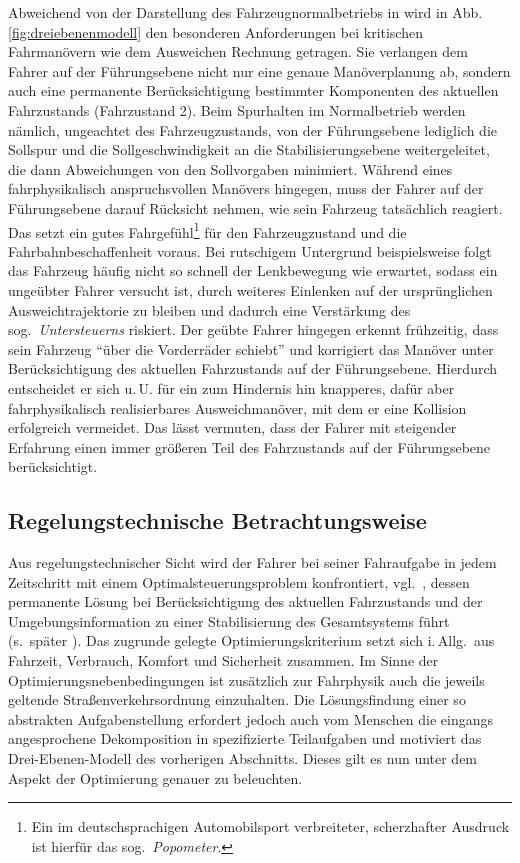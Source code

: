 Abweichend von der Darstellung des Fahrzeugnormalbetriebs in \cite{handbuchFAS_Donges2012} wird in Abb.\,\ref{fig:dreiebenenmodell} den besonderen Anforderungen bei kritischen Fahrmanövern wie dem Ausweichen Rechnung getragen. Sie verlangen dem Fahrer auf der Führungsebene nicht nur eine genaue Manöverplanung ab, sondern auch eine permanente Berücksichtigung bestimmter Komponenten des aktuellen Fahrzustands (Fahrzustand 2). 
Beim Spurhalten im Normalbetrieb werden nämlich, ungeachtet des Fahrzeugzustands, von der Führungsebene lediglich die Sollspur und die Sollgeschwindigkeit an die Stabilisierungsebene weitergeleitet, die dann Abweichungen von den Sollvorgaben minimiert. Während eines fahrphysikalisch anspruchsvollen Manövers hingegen, muss der Fahrer auf der Führungsebene darauf Rücksicht nehmen, wie sein %
Fahrzeug tatsächlich reagiert. Das setzt ein gutes Fahrgefühl\footnote{Ein im deutschsprachigen Automobilsport verbreiteter, scherzhafter Ausdruck ist hierfür das sog.\ \emph{Popometer}.} für den Fahrzeugzustand und die Fahrbahnbeschaffenheit voraus. 
Bei rutschigem Untergrund beispielsweise folgt das Fahrzeug häufig nicht so schnell der Lenkbewegung wie erwartet, sodass ein ungeübter Fahrer versucht ist, durch weiteres Einlenken auf der ursprünglichen Ausweichtrajektorie zu bleiben und dadurch eine Verstärkung des sog.\ \emph{Untersteuerns} riskiert. Der geübte Fahrer hingegen erkennt frühzeitig, dass sein Fahrzeug "`über die Vorderräder schiebt"' und korrigiert das Manöver unter Berücksichtigung des aktuellen Fahrzustands %
auf der Führungsebene.  Hierdurch entscheidet er sich u.\,U. für ein zum Hindernis hin knapperes, dafür aber fahrphysikalisch realisierbares Ausweichmanöver, mit dem er eine Kollision erfolgreich vermeidet.
Das lässt vermuten, dass der Fahrer mit steigender Erfahrung einen immer größeren Teil des Fahrzustands auf der Führungsebene berücksichtigt.

\subsection{Regelungstechnische Betrachtungsweise}
Aus regelungstechnischer Sicht wird der Fahrer bei seiner Fahraufgabe in jedem Zeitschritt mit einem  Optimalsteuerungsproblem \cite{foellingeroptimal} konfrontiert, vgl.\ \cite{prokop2001modeling, preusse2001fahrzeugfuhrung}, dessen permanente Lösung bei Berücksichtigung des aktuellen Fahrzustands und der Umgebungsinformation zu einer Stabilisierung des Gesamtsystems führt (s.\ später ).
Das zugrunde gelegte Optimierungskriterium setzt sich i.\,Allg.\ aus Fahrzeit, Verbrauch, Komfort und Sicherheit zusammen. Im Sinne der Optimierungsnebenbedingungen ist zusätzlich zur Fahrphysik auch die jeweils geltende Straßenverkehrsordnung einzuhalten. Die Lösungsfindung einer so abstrakten Aufgabenstellung erfordert jedoch auch vom Menschen die eingangs angesprochene Dekomposition in spezifizierte Teilaufgaben und motiviert das Drei-Ebenen-Modell des vorherigen Abschnitts. Dieses gilt es nun unter dem Aspekt der Optimierung genauer zu beleuchten.


